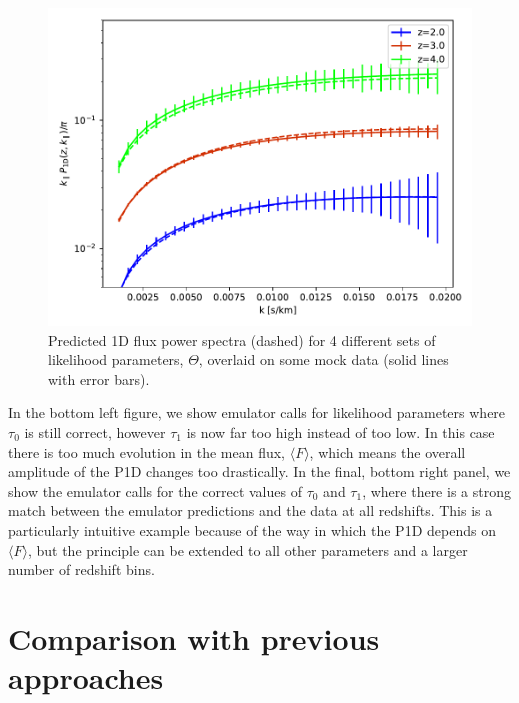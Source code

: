 \documentclass[]{article}
\begin{document}
\begin{figure}[h]
    \includegraphics[scale=0.4]{Figures/goodFit.pdf}
    \caption{Predicted 1D flux power spectra (dashed) for 4 different sets of likelihood
    parameters, $\Theta$, overlaid on some mock data (solid lines with error bars).}
\end{figure}

\noindent In the bottom left figure, we show emulator calls for likelihood parameters
where $\tau_0$ is still correct, however $\tau_1$ is now far too high instead of too low.
In this case there is too much evolution in the mean flux, $\langle F\rangle$, which
means the overall amplitude of the P1D changes too drastically. In the final, bottom right
panel, we show the emulator calls for the correct values of $\tau_0$ and $\tau_1$, where
there is a strong match between the emulator predictions and the data at all redshifts.
This is a particularly intuitive example because of the way in which the P1D depends
on $\langle F\rangle$, but the principle can be extended to all other parameters and
a larger number of redshift bins.

\section{Comparison with previous approaches}



\clearpage
\appendix
\end{document}
